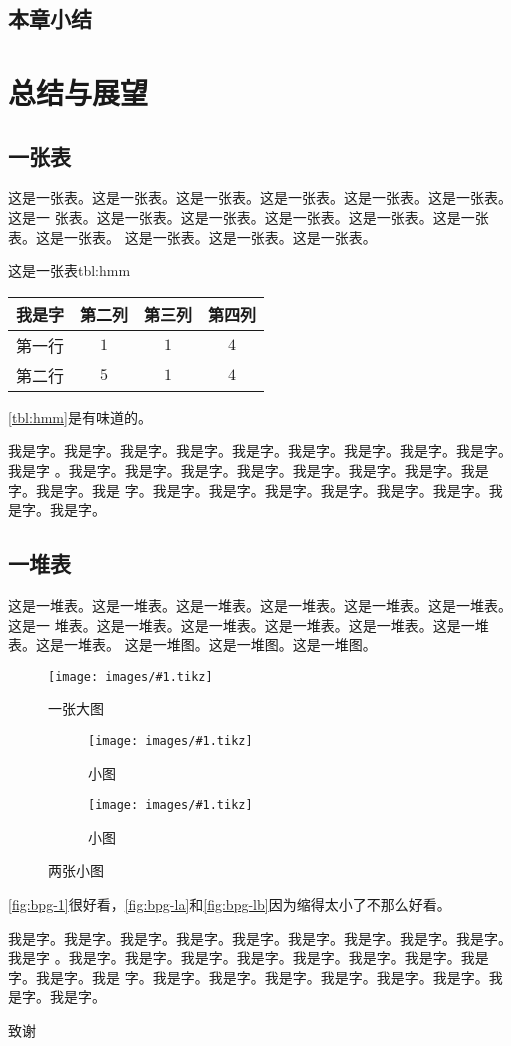 \documentclass[supercite]{HustGraduPaper}
\newcommand{\cfig}[3]{
  \begin{figure}[htb]
    \centering
    \texttt{[image: images/\#1.tikz]}
    \caption{#3}
    \label{fig:#1}
  \end{figure}
}
\newcommand{\sfig}[3]{
  \begin{subfigure}[b]{#2\textwidth}
    \texttt{[image: images/\#1.tikz]}
    \caption{#3}
    \label{fig:#1}
  \end{subfigure}
}
\newcommand{\xfig}[3]{
  \begin{figure}[htb]
    \centering
    #3
    \caption{#2}
    \label{fig:#1}
  \end{figure}
}
\newcommand{\rfig}[1]{\autoref{fig:#1}}
\newcommand{\rtbl}[1]{\autoref{tbl:#1}}
\theoremstyle{definition}
\begin{document}
\subsection{本章小结}
\section{总结与展望}

\subsection{一张表}

这是一张表。这是一张表。这是一张表。这是一张表。这是一张表。这是一张表。这是一
张表。这是一张表。这是一张表。这是一张表。这是一张表。这是一张表。这是一张表。
这是一张表。这是一张表。这是一张表。

\begin{generaltab}{这是一张表}{tbl:hmm}
  \begin{tabular}{c|ccc}
    \toprule
    我是字 & 第二列 & 第三列 & 第四列 \\
    \midrule
    第一行 & $1$ & $1$ & $4$ \\
    第二行 & $5$ & $1$ & $4$ \\
    \bottomrule
  \end{tabular}
\end{generaltab}

\rtbl{hmm}是有味道的。

我是字。我是字。我是字。我是字。我是字。我是字。我是字。我是字。我是字。我是字
。我是字。我是字。我是字。我是字。我是字。我是字。我是字。我是字。我是字。我是
字。我是字。我是字。我是字。我是字。我是字。我是字。我是字。我是字。

\subsection{一堆表}

这是一堆表。这是一堆表。这是一堆表。这是一堆表。这是一堆表。这是一堆表。这是一
堆表。这是一堆表。这是一堆表。这是一堆表。这是一堆表。这是一堆表。这是一堆表。
这是一堆图。这是一堆图。这是一堆图。

\cfig{bpg-1}{0.8}{一张大图}

\xfig{bpg-l}{两张小图}{
  \sfig{bpg-la}{0.3}{小图}
  \sfig{bpg-lb}{0.3}{小图}
}

\rfig{bpg-1}很好看，\rfig{bpg-la}和\rfig{bpg-lb}因为缩得太小了不那么好看。

我是字。我是字。我是字。我是字。我是字。我是字。我是字。我是字。我是字。我是字
。我是字。我是字。我是字。我是字。我是字。我是字。我是字。我是字。我是字。我是
字。我是字。我是字。我是字。我是字。我是字。我是字。我是字。我是字。

\begin{thankpage}

致谢

\end{thankpage}

\nocite{*}


\end{document}
